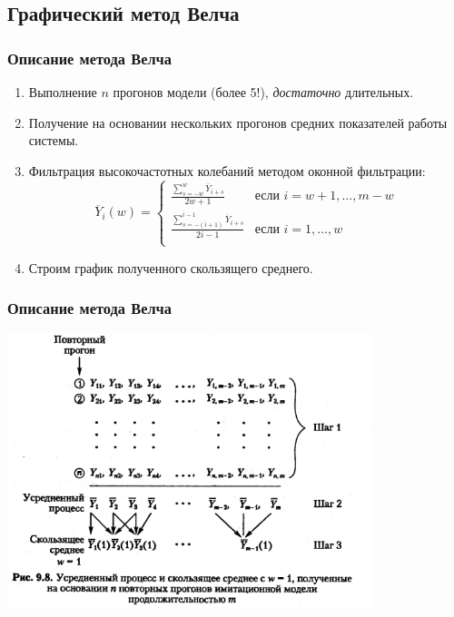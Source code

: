 \documentclass[utf8]{beamer}
\begin{document}
\subsection {Графический метод Велча}
\begin{frame}
\frametitle{Описание метода Велча}
\begin{enumerate}
  \item Выполнение $n$ прогонов модели (более 5!), \emph{достаточно} длительных.
  \item Получение на основании нескольких прогонов средних показателей
  работы системы.
  \item Фильтрация высокочастотных колебаний методом оконной
  фильтрации:
$$
\overline{Y}_i(w) = \left\{
\begin{array}{ll}
\frac{\sum_{s=-w}^{w}\overline{Y}_{i+s}}{2w +1} & \textrm{если } i = w+1, \ldots, m-w\\
\frac{\sum_{s=-(i+1)}^{i-1}\overline{Y}_{i+s}}{2i -1} & \textrm{если } i = 1, \ldots, w\\
\end{array}
\right.
$$
  \item Строим график полученного скользящего среднего.
\end{enumerate}
\end{frame}
\begin{frame}
\frametitle{Описание метода Велча}
\begin{center}
\includegraphics[width=0.8\textwidth]{pic/9-8.png}
\end{center}
\end{frame}
\end{document}
